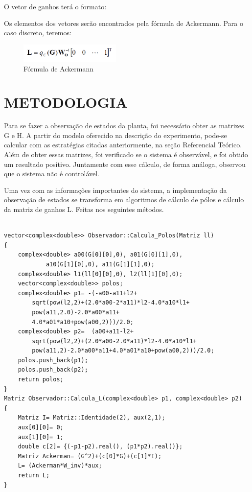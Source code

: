 \documentclass[a4paper,12pt]{article}
\begin{document}
O vetor de ganhos terá o formato:

\hspace{4ex}{\bf L=[L1,L2,…,Ln]}

Os elementos dos vetores serão encontrados pela fórmula de Ackermann. Para o caso discreto, teremos:

\begin{figure}[!h]
\centering
\includegraphics[width=5cm]{fotosLab5/ackermann.png}
\caption{Fórmula de Ackermann}
\label{ackermann}
\end{figure}


\newpage



\section{METODOLOGIA}

\hspace{4ex}Para se fazer a observação de estados da planta, foi necessário obter as matrizes G e H. A partir do modelo oferecido na descrição do experimento, pode-se calcular com as estratégias citadas anteriormente, na seção Referencial Teórico. Além de obter essas matrizes, foi verificado se o sistema é observável, e foi obtido um resultado positivo. Juntamente com esse cálculo, de forma análoga, observou que o sistema não é controlável.

\hspace{4ex}Uma vez com as informações importantes do sistema, a implementação da observação de estados se transforma em algoritmos de cálculo de pólos e cálculo da matriz de ganhos L. Feitas nos seguintes métodos.

\begin{lstlisting}

vector<complex<double>> Observador::Calcula_Polos(Matriz ll)
{
    complex<double> a00(G[0][0],0), a01(G[0][1],0), 
    		a10(G[1][0],0), a11(G[1][1],0);
    complex<double> l1(ll[0][0],0), l2(ll[1][0],0);
    vector<complex<double>> polos;
    complex<double> p1= -(-a00-a11+l2+
    	sqrt(pow(l2,2)+(2.0*a00-2*a11)*l2-4.0*a10*l1+
    	pow(a11,2.0)-2.0*a00*a11+
    	4.0*a01*a10+pow(a00,2)))/2.0;
    complex<double> p2=  (a00+a11-l2+
    	sqrt(pow(l2,2)+(2.0*a00-2.0*a11)*l2-4.0*a10*l1+
    	pow(a11,2)-2.0*a00*a11+4.0*a01*a10+pow(a00,2)))/2.0;
    polos.push_back(p1);
    polos.push_back(p2);
    return polos;
}
Matriz Observador::Calcula_L(complex<double> p1, complex<double> p2)
{
    Matriz I= Matriz::Identidade(2), aux(2,1);
    aux[0][0]= 0;
    aux[1][0]= 1;
    double c[2]= {(-p1-p2).real(), (p1*p2).real()};
    Matriz Ackerman= (G^2)+(c[0]*G)+(c[1]*I);
    L= (Ackerman*W_inv)*aux;
    return L;
}

\end{lstlisting}
\end{document}

